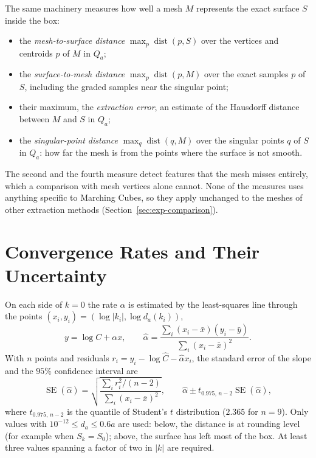 The same machinery measures how well a mesh $M$ represents the exact surface
$S$ inside the box:
\begin{itemize}
    \item the \emph{mesh-to-surface distance}
          $\max_{p}\operatorname{dist}(p,S)$ over the vertices and centroids
          $p$ of $M$ in $Q_a$;
    \item the \emph{surface-to-mesh distance}
          $\max_{p}\operatorname{dist}(p,M)$ over the exact samples $p$ of
          $S$, including the graded samples near the singular point;
    \item their maximum, the \emph{extraction error}, an estimate of the
          Hausdorff distance between $M$ and $S$ in $Q_a$;
    \item the \emph{singular-point distance}
          $\max_{q}\operatorname{dist}(q,M)$ over the singular points $q$ of
          $S$ in $Q_a$: how far the mesh is from the points where the surface
          is not smooth.
\end{itemize}
The second and the fourth measure detect features that the mesh misses
entirely, which a comparison with mesh vertices alone cannot. None of the
measures uses anything specific to Marching Cubes, so they apply unchanged to
the meshes of other extraction methods
(Section~\ref{sec:exp-comparison}).

\section{Convergence Rates and Their Uncertainty}
\label{sec:method-rates}

On each side of $k=0$ the rate $\alpha$ is estimated by the least-squares line
through the points $(x_i,y_i)=(\log|k_i|,\log d_a(k_i))$,
\[
y=\log C+\alpha x,\qquad
\hat\alpha=\frac{\sum_i(x_i-\bar x)(y_i-\bar y)}{\sum_i(x_i-\bar x)^2}.
\]
With $n$ points and residuals $r_i=y_i-\log\hat C-\hat\alpha x_i$, the standard
error of the slope and the $95\%$ confidence interval are
\cite{draper1998applied}
\begin{equation}
\label{eq:slope-ci}
\operatorname{SE}(\hat\alpha)=\sqrt{\frac{\sum_ir_i^2/(n-2)}{\sum_i(x_i-\bar x)^2}},\qquad
\hat\alpha\pm t_{0.975,\,n-2}\operatorname{SE}(\hat\alpha),
\end{equation}
where $t_{0.975,\,n-2}$ is the quantile of Student's $t$ distribution
($2.365$ for $n=9$). Only values with $10^{-12}\le d_a\le0.6a$ are used: below,
the distance is at rounding level (for example when $S_k=S_0$); above, the
surface has left most of the box. At least three values spanning a factor of
two in $|k|$ are required.

